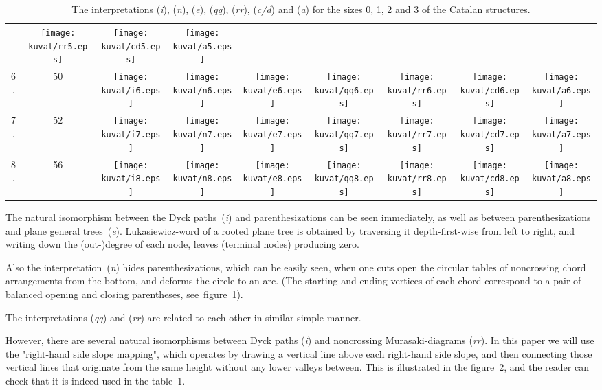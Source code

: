 \documentclass[11pt]{article} %
\newcommand{\catint}[1]{({\it #1})}
\begin{document}
\begin{table}[htbp]
\begin{tabular}{c c c c c c c c c}
 & \texttt{[image: kuvat/rr5.eps]}
 & \texttt{[image: kuvat/cd5.eps]} & \texttt{[image: kuvat/a5.eps]}\\
6. \vspace{0.1in} & 50 & \texttt{[image: kuvat/i6.eps]} & \texttt{[image: kuvat/n6.eps]}
 & \texttt{[image: kuvat/e6.eps]} & \texttt{[image: kuvat/qq6.eps]}
 & \texttt{[image: kuvat/rr6.eps]}
 & \texttt{[image: kuvat/cd6.eps]} & \texttt{[image: kuvat/a6.eps]}\\
7. \vspace{0.1in} & 52 & \texttt{[image: kuvat/i7.eps]} & \texttt{[image: kuvat/n7.eps]}
 & \texttt{[image: kuvat/e7.eps]} & \texttt{[image: kuvat/qq7.eps]}
 & \texttt{[image: kuvat/rr7.eps]}
 & \texttt{[image: kuvat/cd7.eps]} & \texttt{[image: kuvat/a7.eps]}\\
8. \vspace{0.1in} & 56 & \texttt{[image: kuvat/i8.eps]} & \texttt{[image: kuvat/n8.eps]}
 & \texttt{[image: kuvat/e8.eps]} & \texttt{[image: kuvat/qq8.eps]}
 & \texttt{[image: kuvat/rr8.eps]}
 & \texttt{[image: kuvat/cd8.eps]} & \texttt{[image: kuvat/a8.eps]}\\
\end{tabular}
\caption{The interpretations \catint{i}, \catint{n}, \catint{e}, \catint{qq}, \catint{rr}, \catint{c/d} and \catint{a} for the sizes 0, 1, 2 and 3 of the Catalan structures.}
\end{table}

The natural isomorphism between the Dyck paths~\catint{i}
and parenthesizations can be seen immediately, as well as
between parenthesizations and plane general trees~\catint{e}.
Lukasiewicz-word of a rooted plane tree is obtained by
traversing it depth-first-wise from left to right, and
writing down the (out-)degree of each node, leaves
(terminal nodes) producing zero.

Also the interpretation~\catint{n} hides parenthesizations,
which can be easily seen, when one cuts open the
circular tables of noncrossing chord arrangements
from the bottom, and deforms the circle
to an arc. (The starting and ending vertices
of each chord correspond to a pair of balanced opening
and closing parentheses, see~figure~1).

The interpretations \catint{qq} and \catint{rr} are related to each
other in similar simple manner.

However, there are several natural isomorphisms between Dyck paths
\catint{i} and noncrossing Murasaki-diagrams \catint{rr}.
In this paper we will use the "right-hand side slope mapping",
which operates by drawing a vertical line above each right-hand side
slope, and then connecting those vertical lines that originate from
the same height without any lower valleys between. This is
illustrated in the figure~2, and the reader can check that
it is indeed used in the table~1.
\end{document}
